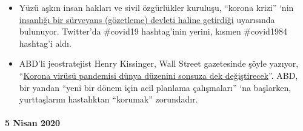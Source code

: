 \begin{itemize}
{  artarak 6 milyonu aşmıştır} (bkz. Grafik), bu ise 1929'daki Büyük
  Bunalım'dan bu yana eşi benzeri olmayan bir rakamdır.
\item
  Yüzü aşkın insan hakları ve sivil özgürlükler kuruluşu, ``korona
  krizi'' `nin
  \href{https://www.dailymail.co.uk/news/article-8181381/World-sleepwalking-surveillance-state-rights-groups-warn.html}{insanlığı
  bir sürveyans (gözetleme) devleti haline getirdiği} uyarısında
  bulunuyor. Twitter'da \#covid19 hashtag'inin yerini, kısmen
  \#covid1984 hashtag'i aldı.
\item
  ABD'li jeostratejist Henry Kissinger, Wall Street gazetesinde şöyle
  yazıyor,
  ``\href{https://www.wsj.com/articles/the-coronavirus-pandemic-will-forever-alter-the-world-order-11585953005}{Korona
  virüsü pandemisi dünya düzenini sonsuza dek değiştirecek}''. ABD, bir
  yandan ``yeni bir dönem için acil planlama çalışmaları'' `na
  başlarken, yurttaşlarını hastalıktan ``korumak'' zorundadır.
\end{itemize}

\hypertarget{5-nisan-2020}{%
\paragraph{5 Nisan 2020}\label{5-nisan-2020}}

